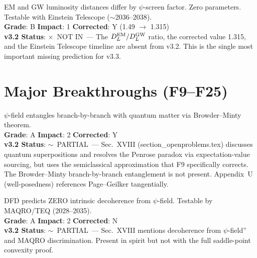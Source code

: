 \documentclass[11pt,a4paper]{article}
\newcommand{\vpartial}{\textcolor{statusPARTIAL}{$\sim$~PARTIAL}}
\newcommand{\vnot}{\textcolor{statusNOT}{$\times$~NOT IN}}
\begin{document}
\begin{tcolorbox}[colback=paradigm!5,colframe=paradigm,title=\textbf{F8: $D_L^{\rm EM}/D_L^{\rm GW} = e^{\Delta\psi(z)}$, Reaching 1.315 at $z=1$}]
EM and GW luminosity distances differ by $\psi$-screen factor. Zero parameters. Testable with Einstein Telescope ($\sim$2036--2038).\\
\textbf{Grade}: B \quad \textbf{Impact}: 1 \quad \textbf{Corrected}: Y (1.49 $\to$ 1.315)\\
\textbf{v3.2 Status}: \vnot\ --- The $D_L^{\rm EM}/D_L^{\rm GW}$ ratio, the corrected value 1.315, and the Einstein Telescope timeline are absent from v3.2. This is the single most important missing prediction for v3.3.
\end{tcolorbox}


\section{Major Breakthroughs (F9--F25)}\label{sec:major}

\begin{tcolorbox}[colback=major!5,colframe=major,title=\textbf{F9: Branch-by-Branch Gravity Resolves Page--Geilker Objection}]
$\psi$-field entangles branch-by-branch with quantum matter via Browder--Minty theorem.\\
\textbf{Grade}: A \quad \textbf{Impact}: 2 \quad \textbf{Corrected}: Y\\
\textbf{v3.2 Status}: \vpartial\ --- Sec.~XVIII (section\_openproblems.tex) discusses quantum superpositions and resolves the Penrose paradox via expectation-value sourcing, but uses the semiclassical approximation that F9 specifically corrects. The Browder--Minty branch-by-branch entanglement is not present. Appendix~U (well-posedness) references Page--Geilker tangentially.
\end{tcolorbox}

\begin{tcolorbox}[colback=major!5,colframe=major,title=\textbf{F10: Zero Gravitational Decoherence Prediction}]
DFD predicts ZERO intrinsic decoherence from $\psi$-field. Testable by MAQRO/TEQ (2028--2035).\\
\textbf{Grade}: A \quad \textbf{Impact}: 2 \quad \textbf{Corrected}: N\\
\textbf{v3.2 Status}: \vpartial\ --- Sec.~XVIII mentions decoherence from $\psi$-field'' and MAQRO discrimination. Present in spirit but not with the full saddle-point convexity proof.
\end{tcolorbox}
\end{document}
